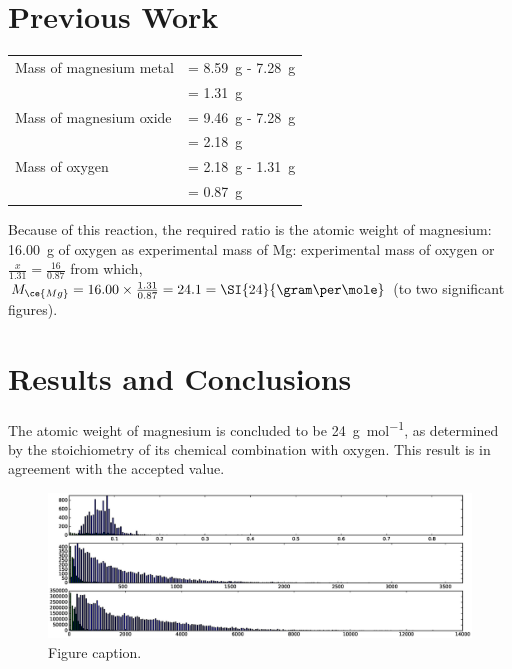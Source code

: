 \documentclass{article}
\begin{document}

\section{Previous Work}

\begin{tabular}{ll}
Mass of magnesium metal & = \SI{8.59}{\gram} - \SI{7.28}{\gram}\\
& = \SI{1.31}{\gram}\\
Mass of magnesium oxide & = \SI{9.46}{\gram} - \SI{7.28}{\gram}\\
& = \SI{2.18}{\gram}\\
Mass of oxygen & = \SI{2.18}{\gram} - \SI{1.31}{\gram}\\
& = \SI{0.87}{\gram}
\end{tabular}

Because of this reaction, the required ratio is the atomic weight of magnesium: \SI{16.00}{\gram} of oxygen as experimental mass of Mg: experimental mass of oxygen or $\frac{x}{1.31}=\frac{16}{0.87}$ from which, $M_{\ce{Mg}} = 16.00 \times \frac{1.31}{0.87} = 24.1 = \SI{24}{\gram\per\mole}$ (to two significant figures).


\section{Results and Conclusions}

The atomic weight of magnesium is concluded to be \SI{24}{\gram\per\mol}, as determined by the stoichiometry of its chemical combination with oxygen. This result is in agreement with the accepted value.

\begin{figure}[ht]
\begin{center}
\includegraphics[width=1\textwidth]{hists}
\caption{Figure caption.}
\end{center}
\end{figure}
\end{document}
